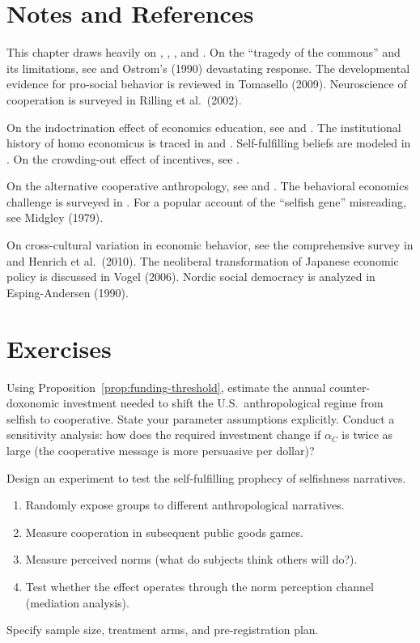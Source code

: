 \section{Notes and References}
\label{sec:ch21-notes}

This chapter draws heavily on \textcite{bowles2011}, \textcite{fischbacher2001}, \textcite{henrich2001}, and \textcite{ostrom1990}.
On the ``tragedy of the commons'' and its limitations, see \textcite{hardin1968} and Ostrom's (1990) devastating response.
The developmental evidence for pro-social behavior is reviewed in Tomasello (2009).
Neuroscience of cooperation is surveyed in Rilling et al.\ (2002).

On the indoctrination effect of economics education, see \textcite{frank1993} and \textcite{bauman1996}.
The institutional history of homo economicus is traced in \textcite{mirowski2009} and \textcite{fourcade2009}.
Self-fulfilling beliefs are modeled in \textcite{schelling1978}.
On the crowding-out effect of incentives, see \textcite{frey1997}.

On the alternative cooperative anthropology, see \textcite{gintis2005} and \textcite{nowak2006}.
The behavioral economics challenge is surveyed in \textcite{kahneman2011}.
For a popular account of the ``selfish gene'' misreading, see Midgley (1979).

On cross-cultural variation in economic behavior, see the comprehensive survey in \textcite{henrich2001} and Henrich et al.\ (2010).
The neoliberal transformation of Japanese economic policy is discussed in Vogel (2006).
Nordic social democracy is analyzed in Esping-Andersen (1990).

\section{Exercises}

\begin{exercise}
Using Proposition~\ref{prop:funding-threshold}, estimate the annual counter-doxonomic investment needed to shift the U.S.\ anthropological regime from selfish to cooperative.
State your parameter assumptions explicitly.
Conduct a sensitivity analysis: how does the required investment change if $\alpha_C$ is twice as large (the cooperative message is more persuasive per dollar)?
\end{exercise}

\begin{exercise}
Design an experiment to test the self-fulfilling prophecy of selfishness narratives.
\begin{enumerate}[nosep]
  \item Randomly expose groups to different anthropological narratives.
  \item Measure cooperation in subsequent public goods games.
  \item Measure perceived norms (what do subjects think others will do?).
  \item Test whether the effect operates through the norm perception channel (mediation analysis).
\end{enumerate}
Specify sample size, treatment arms, and pre-registration plan.
\end{exercise}

